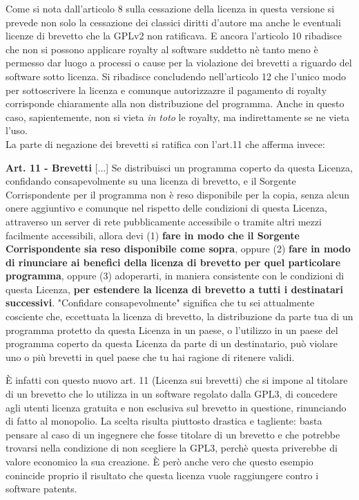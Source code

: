 Come si nota dall'articolo 8 sulla cessazione della licenza in questa versione si prevede non solo la cessazione dei classici diritti d'autore ma anche le eventuali licenze di brevetto che la GPLv2 non ratificava. E ancora l'articolo 10 ribadisce che non si possono applicare royalty al software suddetto nè tanto meno è permesso dar luogo a processi o cause per la violazione dei brevetti a riguardo del software sotto licenza. Si ribadisce concludendo nell'articolo 12 che l'unico modo per sottoscrivere la licenza e comunque autorizzazre il pagamento di royalty corrisponde chiaramente alla non distribuzione del programma. Anche in questo caso, sapientemente, non si vieta \textit{in toto} le royalty, ma indirettamente se ne vieta l'uso.\\

La parte di negazione dei brevetti si ratifica con l'art.11 che afferma invece:\\

\begin{scriptsize}

\textbf{Art. 11 -  Brevetti}
[...]
Se distribuisci un programma coperto da questa Licenza, confidando consapevolmente su una licenza di brevetto, e il Sorgente Corrispondente per il programma non è reso disponibile per la copia, senza alcun onere aggiuntivo e comunque nel rispetto delle condizioni di questa Licenza, attraverso un server di rete pubblicamente accessibile o tramite altri mezzi facilmente accessibili, allora devi (1) \textbf{fare in modo che il Sorgente Corrispondente sia reso disponibile come sopra}, oppure (2) \textbf{fare in modo di rinunciare ai benefici della licenza di brevetto per quel particolare programma}, oppure (3) adoperarti, in maniera consistente con le condizioni di questa Licenza, \textbf{per estendere la licenza di brevetto a tutti i destinatari successivi}. "Confidare consapevolmente" significa che tu sei attualmente cosciente che, eccettuata la licenza di brevetto, la distribuzione da parte tua di un programma protetto da questa Licenza in un paese, o l'utilizzo in un paese del programma coperto da questa Licenza da parte di un destinatario, può violare uno o più brevetti in quel paese che tu hai ragione di ritenere validi.\\

\end{scriptsize}


\`E infatti con questo nuovo art. 11 (Licenza sui brevetti) che si impone al titolare di un brevetto che lo utilizza in un software regolato dalla GPL3, di concedere agli utenti licenza gratuita e non esclusiva sul brevetto in questione, rinunciando di fatto al monopolio. La scelta risulta piuttosto drastica e tagliente: basta pensare al caso di un ingegnere che fosse titolare di un brevetto e che potrebbe trovarsi nella condizione di non scegliere la GPL3, perchè questa priverebbe di valore economico la sua creazione. \`E però anche vero che questo esempio conincide proprio il risultato che questa licenza vuole raggiungere contro i software patents.


